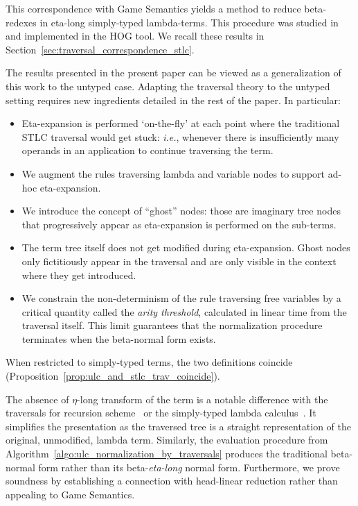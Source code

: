 \documentclass{elsarticle}
\makeatletter
\theoremstyle{plain}
\theoremstyle{definition}
\theoremstyle{remark}
\renewcommand\ie{{\it i.e.\@\xspace}}
\makeatother
\begin{document}
 This correspondence with Game Semantics yields a method to reduce beta-redexes in eta-long simply-typed lambda-terms. This procedure was studied in~\cite{BlumPhd,BlumGalop2008,Blum-HogTool,Ong-NormByTrav2015} and implemented in the HOG tool\cite{BlumGalop2008, BlumPhd}. We recall these results in Section~\ref{sec:traversal_correspondence_stlc}.

 The results presented in the present paper can be viewed as a generalization of this work to the untyped case. Adapting the traversal theory to the untyped setting requires new ingredients detailed in the rest of the paper. In particular:
\begin{itemize}[nosep]
 \item Eta-expansion is performed `on-the-fly' at each point where the traditional STLC traversal would get stuck: \ie, whenever there is insufficiently many operands in an application to continue traversing the term.
 \item  We augment the rules traversing lambda and variable nodes to support ad-hoc eta-expansion.
 \item We introduce the concept of ``ghost'' nodes: those are imaginary tree nodes that progressively appear as eta-expansion is performed on the sub-terms.
\item The term tree itself does not get modified during eta-expansion. Ghost nodes only fictitiously appear in the traversal and are only visible in the context where they get introduced.
\item We constrain the non-determinism of the rule traversing free variables by a critical quantity called the \emph{arity threshold}, calculated in linear time from the traversal itself. This limit guarantees that the normalization procedure terminates when the beta-normal form exists.
\end{itemize}

When restricted to simply-typed terms, the two definitions coincide (Proposition~\ref{prop:ulc_and_stlc_trav_coincide}).

The absence of $\eta$-long transform of the term is a notable difference with the traversals for recursion scheme~\cite{Ong2006} or the simply-typed lambda calculus~\cite{BlumPhd}. It simplifies the presentation as the traversed tree is a straight representation of the original, unmodified, lambda term. Similarly, the evaluation procedure from Algorithm~\ref{algo:ulc_normalization_by_traversals} produces the traditional beta-normal form rather than its beta-\emph{eta-long} normal form. Furthermore, we prove soundness by establishing a connection with head-linear reduction rather than appealing to Game Semantics.
\end{document}
